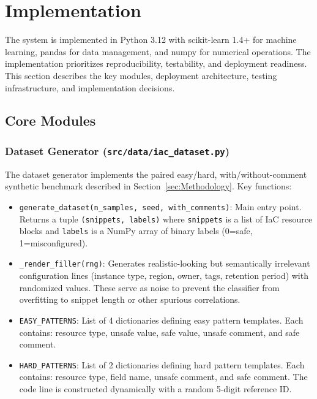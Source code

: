 
\section{Implementation}
\label{sec:Implementation}

The system is implemented in Python 3.12 with scikit-learn 1.4+ for machine learning, pandas for data management, and numpy for numerical operations. The implementation prioritizes reproducibility, testability, and deployment readiness. This section describes the key modules, deployment architecture, testing infrastructure, and implementation decisions.

\subsection{Core Modules}

\subsubsection{Dataset Generator (\texttt{src/data/iac\_dataset.py})}

The dataset generator implements the paired easy/hard, with/without-comment synthetic benchmark described in Section~\ref{sec:Methodology}. Key functions:

\begin{itemize}
  \item \texttt{generate\_dataset(n\_samples, seed, with\_comments)}: Main entry point. Returns a tuple \texttt{(snippets, labels)} where \texttt{snippets} is a list of IaC resource blocks and \texttt{labels} is a NumPy array of binary labels (0=safe, 1=misconfigured).
  
  \item \texttt{\_render\_filler(rng)}: Generates realistic-looking but semantically irrelevant configuration lines (instance type, region, owner, tags, retention period) with randomized values. These serve as noise to prevent the classifier from overfitting to snippet length or other spurious correlations.
  
  \item \texttt{EASY\_PATTERNS}: List of 4 dictionaries defining easy pattern templates. Each contains: resource type, unsafe value, safe value, unsafe comment, and safe comment.
  
  \item \texttt{HARD\_PATTERNS}: List of 2 dictionaries defining hard pattern templates. Each contains: resource type, field name, unsafe comment, and safe comment. The code line is constructed dynamically with a random 5-digit reference ID.
\end{itemize}

